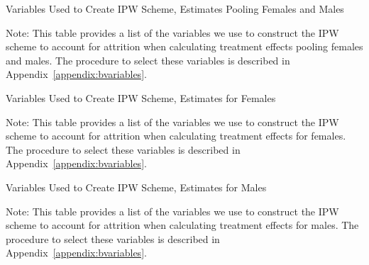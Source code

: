 \begin{sidewaystable}[H] 
\begin{threeparttable}
\caption{Variables Used to Create IPW Scheme, Estimates Pooling Females and Males}
\label{table:attpooled}
\centering 

\begin{tablenotes}
\footnotesize
\item Note: This table provides a list of the variables we use to construct the IPW scheme to account for attrition when calculating treatment effects pooling females and males. The procedure to select these variables is described in Appendix~\ref{appendix:bvariables}.
\end{tablenotes}
\end{threeparttable}
\end{sidewaystable}

\begin{sidewaystable}[H] 
\begin{threeparttable}
\caption{Variables Used to Create IPW Scheme, Estimates for Females}
\label{table:attfemales}
\centering 

\begin{tablenotes}
\footnotesize
\item Note: This table provides a list of the variables we use to construct the IPW scheme to account for attrition when calculating treatment effects for females. The procedure to select these variables is described in Appendix~\ref{appendix:bvariables}.
\end{tablenotes}
\end{threeparttable}
\end{sidewaystable}

\begin{sidewaystable}[H] 
\begin{threeparttable}
\caption{Variables Used to Create IPW Scheme, Estimates for Males}
\label{table:attfemales}
\centering 

\begin{tablenotes}
\footnotesize
\item Note: This table provides a list of the variables we use to construct the IPW scheme to account for attrition when calculating treatment effects for males.  The procedure to select these variables is described in Appendix~\ref{appendix:bvariables}.
\end{tablenotes}
\end{threeparttable}
\end{sidewaystable}
\restoregeometry
\doublespacing